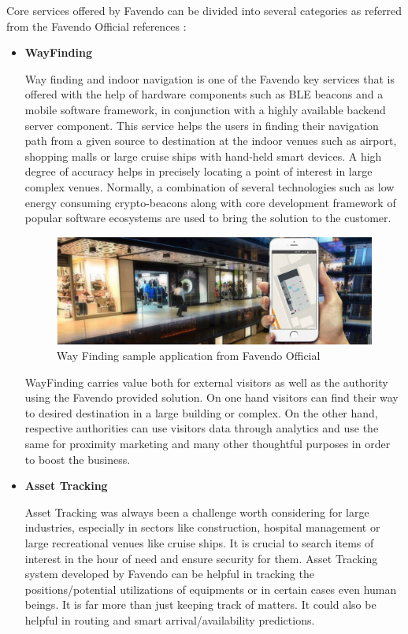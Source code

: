\par Core services offered by Favendo can be divided into several categories as referred from the Favendo Official references \cite{favendoataglance}:
\begin{itemize}
	\item \textbf{WayFinding}
	\par Way finding and indoor navigation is one of the Favendo key services that is offered with the help of hardware components such as BLE beacons and a mobile software framework, in conjunction with a highly available backend server component. This service helps the users in finding their navigation path from a given source to destination at the indoor venues such as airport, shopping malls or large cruise ships with hand-held  smart devices. A high degree of accuracy helps in precisely locating a point of interest in large complex venues. Normally, a combination of several technologies such as low energy consuming crypto-beacons along with core development framework of popular software ecosystems are used to bring the solution to the customer.
	\begin{figure}[H]
		\centering
		\includegraphics[scale = 0.3]{images/wayfinding}
		\caption{Way Finding sample application from Favendo Official \cite{favendoataglance}}
		\label{figure:wayfinding_sample}
	\end{figure}
	\par WayFinding carries value both for external visitors as well as the authority using the Favendo provided solution. On one hand visitors can find their way to desired destination in a large building or complex. On the other hand, respective authorities can use visitors data through analytics and use the same for proximity marketing and many other thoughtful purposes in order to boost the business.
	\item \textbf{Asset Tracking}
	\par Asset Tracking was always been a challenge worth considering for large industries, especially in sectors like construction, hospital management or large recreational venues like cruise ships. It is crucial to search items of interest in the hour of need and ensure security for them. Asset Tracking system developed by Favendo can be helpful in tracking the positions/potential utilizations of equipments or in certain cases even human beings. It is far more than just keeping track of matters. It could also be helpful in routing and smart arrival/availability predictions.

\end{itemize}
